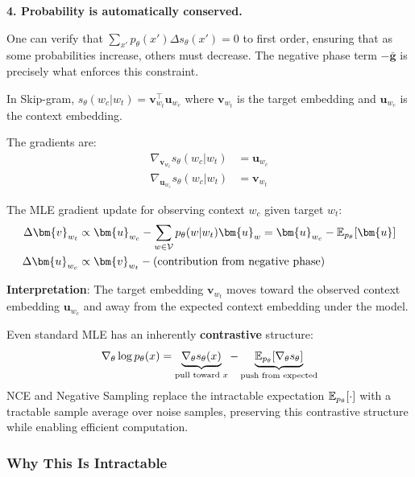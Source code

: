 \begin{notechapter}
\begin{intuition}
\medskip
\textbf{4. Probability is automatically conserved.}

One can verify that $\sum_{x'} p_\theta(x') \Delta s_\theta(x') = 0$ to first order, ensuring that as some probabilities increase, others must decrease. The negative phase term $-\bar{\bm{g}}$ is precisely what enforces this constraint.
\end{intuition}

\begin{example}
In Skip-gram, $s_\theta(w_c | w_t) = \bm{v}_{w_t}^\top \bm{u}_{w_c}$ where $\bm{v}_{w_t}$ is the target embedding and $\bm{u}_{w_c}$ is the context embedding.

The gradients are:
\begin{align}
\nabla_{\bm{v}_{w_t}} s_\theta(w_c | w_t) &= \bm{u}_{w_c} \\
\nabla_{\bm{u}_{w_c}} s_\theta(w_c | w_t) &= \bm{v}_{w_t}
\end{align}

The MLE gradient update for observing context $w_c$ given target $w_t$:
\begin{align}
\Delta \bm{v}_{w_t} &\propto \bm{u}_{w_c} - \sum_{w \in \vocab} p_\theta(w|w_t) \bm{u}_w = \bm{u}_{w_c} - \E_{p_\theta}[\bm{u}] \\
\Delta \bm{u}_{w_c} &\propto \bm{v}_{w_t} - \text{(contribution from negative phase)}
\end{align}

\textbf{Interpretation}: The target embedding $\bm{v}_{w_t}$ moves toward the observed context embedding $\bm{u}_{w_c}$ and away from the expected context embedding under the model.
\end{example}

\begin{keyresult}
Even standard MLE has an inherently \textbf{contrastive} structure:
\begin{equation}
\nabla_\theta \log p_\theta(x) = \underbrace{\nabla_\theta s_\theta(x)}_{\text{pull toward } x} - \underbrace{\mathbb{E}_{p_\theta}[\nabla_\theta s_\theta]}_{\text{push from expected}}
\end{equation}
NCE and Negative Sampling replace the intractable expectation $\mathbb{E}_{p_\theta}[\cdot]$ with a tractable sample average over noise samples, preserving this contrastive structure while enabling efficient computation.
\end{keyresult}

\subsubsection{Why This Is Intractable}


\end{notechapter}
